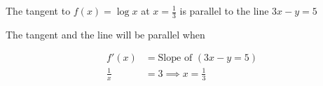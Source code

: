 \documentclass[14pt,fleqn]{extarticle}
\begin{document}
 
\begin{snippet}
    \correct
    
    The tangent to $f(x) = \log x$ at $x=\frac{1}{3}$ is parallel to the line 
    $3x - y = 5$ 
    
    \reason
    
    The tangent and the line will be parallel when 
    
    \begin{align}
	f'(x) &= \text{Slope of }\left(3x - y = 5  \right) \\
	\frac{1}{x} &= 3 \implies x = \frac{1}{3}
\end{align}

\end{snippet} 
\end{document}
